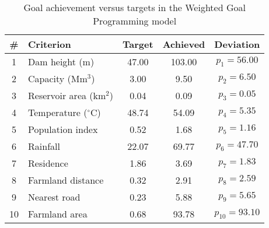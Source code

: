 \begin{table}[htbp]
\centering
\caption{Goal achievement versus targets in the Weighted Goal Programming model}
\label{tab:wgpAcheivementVsTarget}
\begin{tabular}{clccc}
\hline
\textbf{\#} & \textbf{Criterion} & \textbf{Target} & \textbf{Achieved} & \textbf{Deviation} \\
\hline
1  & Dam height (m)        & 47.00   & 103.00   & $p_{1} = 56.00$ \\
2  & Capacity (Mm$^{3}$)   & 3.00    & 9.50     & $p_{2} = 6.50$  \\
3  & Reservoir area (km$^{2}$) & 0.04 & 0.09     & $p_{3} = 0.05$  \\
4  & Temperature ($^{\circ}$C) & 48.74 & 54.09   & $p_{4} = 5.35$  \\
5  & Population index      & 0.52    & 1.68     & $p_{5} = 1.16$  \\
6  & Rainfall              & 22.07   & 69.77    & $p_{6} = 47.70$ \\
7  & Residence             & 1.86    & 3.69     & $p_{7} = 1.83$  \\
8  & Farmland distance     & 0.32    & 2.91     & $p_{8} = 2.59$  \\
9  & Nearest road          & 0.23    & 5.88     & $p_{9} = 5.65$  \\
10 & Farmland area         & 0.68    & 93.78    & $p_{10} = 93.10$ \\
\hline
\end{tabular}
\end{table}
